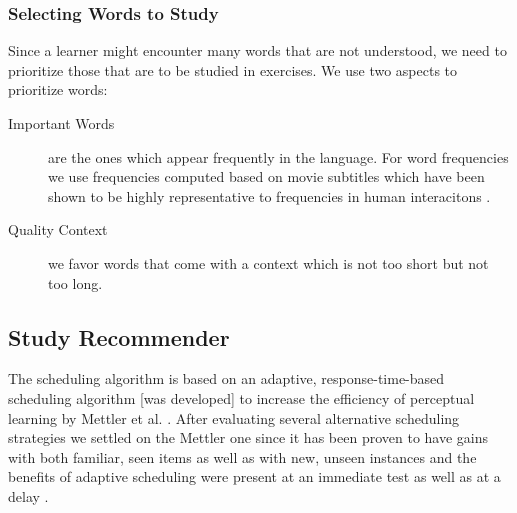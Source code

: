 \subsubsection{Selecting Words to Study}

Since a learner might encounter many words that are not understood, we need to prioritize those that are to be studied in exercises. We use two aspects to prioritize words: 


\begin{description}

  \item [Important Words] are the ones which appear frequently in the language. For word frequencies we use frequencies computed based on movie subtitles which have been shown to be highly representative to frequencies in human interacitons \cite{New07-subtitles}. 
  
  \item [Quality Context] we favor words that come with a context which is not too short but not too long. 

\end{description}

\subsection{Study Recommender}

The scheduling algorithm is based on an adaptive, response-time-based scheduling algorithm [was developed] to increase the efficiency of perceptual learning by Mettler et al. \cite{Mettler14-ARTS}. After evaluating several alternative scheduling strategies we settled on the Mettler one since it has been proven to have gains with both familiar, seen items as well as with new, unseen instances and the benefits of adaptive scheduling were present at an immediate test as well as at a delay \cite{Mettler14-ARTS}.
